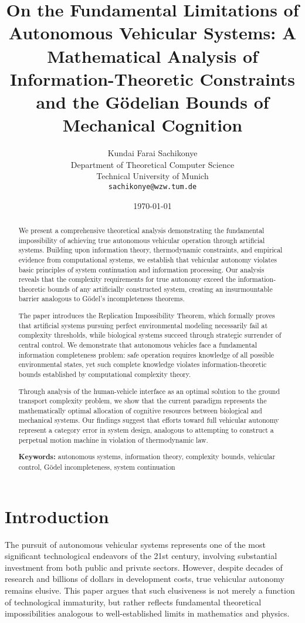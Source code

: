 \documentclass[12pt,a4paper]{article}
\title{On the Fundamental Limitations of Autonomous Vehicular Systems: A Mathematical Analysis of Information-Theoretic Constraints and the Gödelian Bounds of Mechanical Cognition}
\author{Kundai Farai Sachikonye\\
Department of Theoretical Computer Science\\
Technical University of Munich\\
\texttt{sachikonye@wzw.tum.de}}
\date{\today}
\begin{document}
\maketitle

\begin{abstract}
We present a comprehensive theoretical analysis demonstrating the fundamental impossibility of achieving true autonomous vehicular operation through artificial systems. Building upon information theory, thermodynamic constraints, and empirical evidence from computational systems, we establish that vehicular autonomy violates basic principles of system continuation and information processing. Our analysis reveals that the complexity requirements for true autonomy exceed the information-theoretic bounds of any artificially constructed system, creating an insurmountable barrier analogous to Gödel's incompleteness theorems.

The paper introduces the Replication Impossibility Theorem, which formally proves that artificial systems pursuing perfect environmental modeling necessarily fail at complexity thresholds, while biological systems succeed through strategic surrender of central control. We demonstrate that autonomous vehicles face a fundamental information completeness problem: safe operation requires knowledge of all possible environmental states, yet such complete knowledge violates information-theoretic bounds established by computational complexity theory.

Through analysis of the human-vehicle interface as an optimal solution to the ground transport complexity problem, we show that the current paradigm represents the mathematically optimal allocation of cognitive resources between biological and mechanical systems. Our findings suggest that efforts toward full vehicular autonomy represent a category error in system design, analogous to attempting to construct a perpetual motion machine in violation of thermodynamic law.

\textbf{Keywords:} autonomous systems, information theory, complexity bounds, vehicular control, Gödel incompleteness, system continuation
\end{abstract}

\section{Introduction}

The pursuit of autonomous vehicular systems represents one of the most significant technological endeavors of the 21st century, involving substantial investment from both public and private sectors. However, despite decades of research and billions of dollars in development costs, true vehicular autonomy remains elusive. This paper argues that such elusiveness is not merely a function of technological immaturity, but rather reflects fundamental theoretical impossibilities analogous to well-established limits in mathematics and physics.
\end{document}
